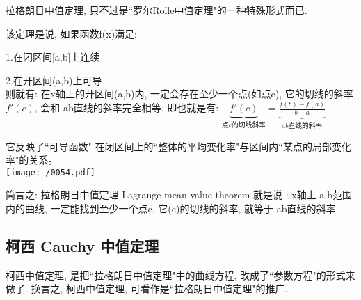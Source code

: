 \documentclass[UTF8]{ctexart}
\begin{document}
	拉格朗日中值定理, 只不过是``罗尔Rolle中值定理"的一种特殊形式而已.
	
	该定理是说, 如果函数f(x)满足: 
	
	1.在闭区间[a,b]上连续 
	
	2.在开区间(a,b)上可导  \\
	
	则就有: 在x轴上的开区间(a,b)内, 一定会存在至少一个点(如点c), 它的切线的斜率 $f'(c)$, 会和 ab直线的斜率完全相等. 即也就是有:  $\underset{\text{点}c\text{的切线斜率}}{\underbrace{f'\left( c \right) }}=\underset{ab\text{直线的斜率}}{\underbrace{\frac{f\left( b \right) -f\left( a \right)}{b-a}}}$
	
	它反映了``可导函数" 在闭区间上的``整体的平均变化率"与区间内``某点的局部变化率"的关系。 \\
	
	\texttt{[image: /0054.pdf]}	
	
	
	简言之: 拉格朗日中值定理 Lagrange mean value theorem 就是说 : x轴上 a,b范围内的曲线, 一定能找到至少一个点c, 它(c)的切线的斜率, 就等于 ab直线的斜率.
	
	
	
	\subsection{柯西 Cauchy 中值定理}	
	
	柯西中值定理, 是把``拉格朗日中值定理"中的曲线方程, 改成了``参数方程"的形式来做了. 换言之, 柯西中值定理, 可看作是``拉格朗日中值定理"的推广. 
	

	
	
\end{document}
